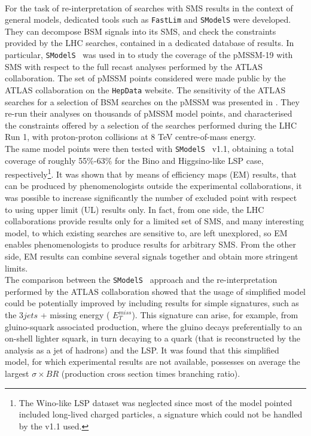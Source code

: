 \documentclass[a4paper,11pt]{article}
\newcommand{\MET}{{ $E_T ^{miss}$}}
\newcommand{\SMO}{\texttt{SModelS\xspace}}
\newcommand{\FASTLIM}{\texttt{FastLim}}
\begin{document}
\\
%
%
%
For the task of re-interpretation of searches with SMS results in the context of general models, dedicated tools such as \FASTLIM \cite{Papucci:2014rja} and \SMO \cite{Kraml:2014sna} were developed. They can decompose BSM signals into its SMS, and check the constraints provided by the LHC searches, contained in a dedicated database of results. In particular, \SMO~ was used in \cite{Ambrogi:2017lov} to study the coverage of the pMSSM-19\cite{Djouadi:1998di} with SMS with respect to the full recast analyses performed by the ATLAS collaboration. The set of pMSSM points considered were made public by the ATLAS collaboration on the \texttt{HepData} website\cite{ATLASpMSSMhepdata}. The sensitivity of the ATLAS searches for a selection of BSM searches on the pMSSM was presented in \cite{Aad:2015baa}. They re-run their analyses on thousands of pMSSM model points, and characterised the constraints offered by a selection of the searches performed during the LHC Run 1, with proton-proton collisions at 8 TeV centre-of-mass energy.
%
\\
The same model points were then tested with \SMO~ v1.1\cite{Ambrogi:2017neo}, obtaining a total coverage of roughly 55$\%$-63$\%$ for the Bino and Higgsino-like LSP case, respectively\footnote{The Wino-like LSP dataset was neglected since most of the model pointed included long-lived charged particles, a signature which could not be handled by the v1.1 used.}. It was shown that by means of efficiency maps (EM) results, that can be produced by phenomenologists outside the experimental collaborations, it was possible to increase significantly the number of excluded point with respect to using upper limit (UL) results only. In fact, from one side, the LHC collaborations provide results only for a limited set of SMS, and many interesting model, to which existing searches are sensitive to, are left unexplored, so EM enables phenomenologists to produce results for arbitrary SMS. From the other side, EM results can combine several signals together and obtain more stringent limits.  
\\
The comparison between the \SMO~ approach and the re-interpretation performed by the ATLAS collaboration showed that the usage of simplified model could be potentially improved by including results for simple signatures, such as the $3jets$ + missing energy (\MET).
This signature can arise, for example, from gluino-squark associated production, where the gluino decays preferentially to an on-shell lighter squark, in turn decaying to a quark (that is reconstructed by the analysis as a jet of hadrons) and the LSP. It was found that this simplified model, for which experimental results are not available, possesses on average the largest $\sigma \times BR$ (production cross section  times branching ratio).
\end{document}
